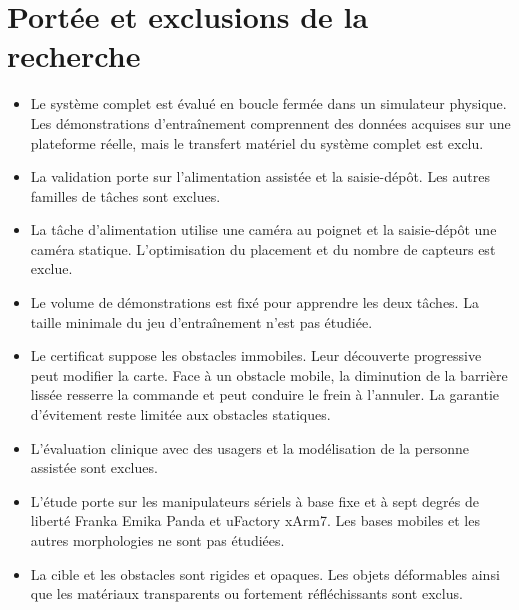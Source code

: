 \section{Portée et exclusions de la recherche}\label{sec:portee}
\begin{itemize}
    \item Le système complet est évalué en boucle fermée dans un simulateur physique. Les démonstrations d'entraînement comprennent des données acquises sur une plateforme réelle, mais le transfert matériel du système complet est exclu.
    \item La validation porte sur l'alimentation assistée et la saisie-dépôt. Les autres familles de tâches sont exclues.
    \item La tâche d'alimentation utilise une caméra au poignet et la saisie-dépôt une caméra statique. L'optimisation du placement et du nombre de capteurs est exclue.
    \item Le volume de démonstrations est fixé pour apprendre les deux tâches. La taille minimale du jeu d'entraînement n'est pas étudiée.
    \item Le certificat suppose les obstacles immobiles. Leur découverte progressive peut modifier la carte. Face à un obstacle mobile, la diminution de la barrière lissée resserre la commande et peut conduire le frein à l'annuler. La garantie d'évitement reste limitée aux obstacles statiques.
    \item L'évaluation clinique avec des usagers et la modélisation de la personne assistée sont exclues.
    \item L'étude porte sur les manipulateurs sériels à base fixe et à sept degrés de liberté Franka Emika Panda et uFactory xArm7. Les bases mobiles et les autres morphologies ne sont pas étudiées.
    \item La cible et les obstacles sont rigides et opaques. Les objets déformables ainsi que les matériaux transparents ou fortement réfléchissants sont exclus.
\end{itemize}
